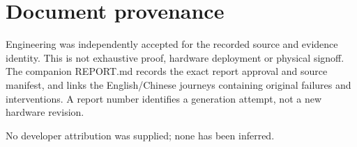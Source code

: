 \documentclass[11pt,a4paper]{article}
\begin{document}
\section{Document provenance}

Engineering was independently accepted for the recorded source and evidence identity. This is not exhaustive proof, hardware deployment or physical signoff. The companion REPORT.md records the exact report approval and source manifest, and links the English/Chinese journeys containing original failures and interventions. A report number identifies a generation attempt, not a new hardware revision.

No developer attribution was supplied; none has been inferred.
\end{document}
